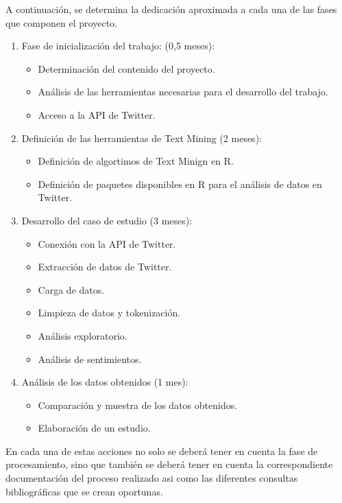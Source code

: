 A continuación, se determina la dedicación aproximada a cada una de las fases que componen el proyecto.

\begin{enumerate}
\item Fase de inicialización del trabajo: (0,5 meses):
  
  \begin{itemize}
  \item Determinación del contenido del proyecto.
  \item Análisis de las herramientas necesarias para el desarrollo del trabajo.
  \item Acceso a la API de Twitter.
  \end{itemize}

\item Definición de las herramientas de Text Mining (2 meses):

  \begin{itemize}
  \item Definición de algortimos de Text Minign en R.
  \item Definición de paquetes disponibles en R para el análisis de datos en Twitter.
  \end{itemize}
  
\item Desarrollo del caso de estudio (3 meses):

 \begin{itemize}
  \item Conexión con la API de Twitter.
  \item Extracción de datos de Twitter.
  \item Carga de datos.
  \item Limpieza de datos y tokenización.
  \item Análisis exploratorio.
  \item Análisis de sentimientos.
  \end{itemize}

\item Análisis de los datos obtenidos (1 mes):

  \begin{itemize}
  \item Comparación y muestra de los datos obtenidos.
  \item Elaboración de un estudio.
  \end{itemize}

\end{enumerate}
En cada una de estas acciones no solo se deberá tener en cuenta la fase de procesamiento, sino que también se deberá tener 
en cuenta la correspondiente documentación del proceso realizado asi como las diferentes consultas bibliográficas que se crean 
oportunas.

